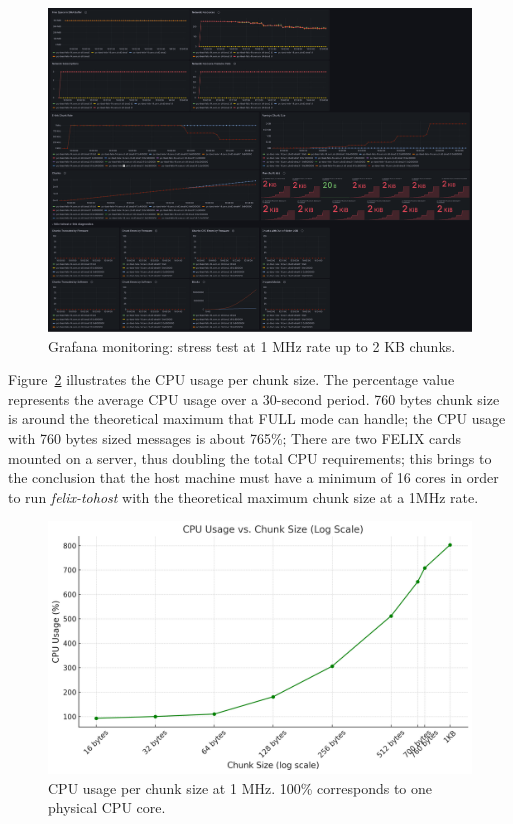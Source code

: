 \begin{figure}[htbp]
\centering
\includegraphics[width=\textwidth]{images/results/tohost-perf.png}
\caption{Grafana monitoring: stress test at 1 MHz rate up to 2 KB chunks.}
\label{fig:tohost-perf}
\end{figure}

Figure~\ref{fig:cpu-usage} illustrates the CPU usage per chunk size. The percentage value represents the average CPU usage over a 30-second period. 760 bytes chunk size is around the theoretical maximum that FULL mode can handle; the CPU usage with 760 bytes sized messages is about 765\%; There are two \acs{FELIX} cards mounted on a server, thus doubling the total CPU requirements; this brings to the conclusion that the host machine must have a minimum of 16 cores in order to run \emph{felix-tohost} with the theoretical maximum chunk size at a 1MHz rate.

\begin{figure}[htbp]
\centering
\includegraphics[width=\textwidth]{images/results/cpu-usage-chunk-size-1MHz.png}
\caption[CPU usage per chunk size at 1 MHz]{CPU usage per chunk size at 1 MHz. 100\% corresponds to one physical CPU core.}
\label{fig:cpu-usage}
\end{figure}


